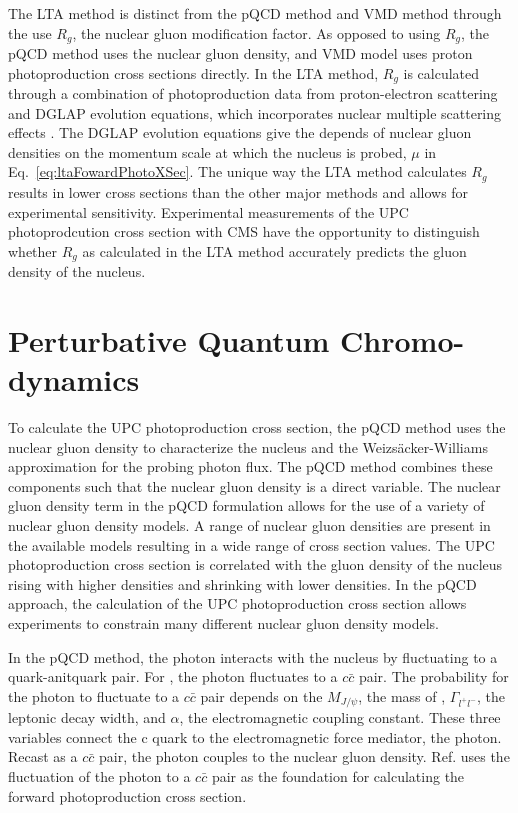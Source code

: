    The LTA method is distinct from the pQCD method and VMD method through the 
     use $R_{g}$, the nuclear gluon modification factor. 
   As opposed to using $R_{g}$, the pQCD method uses the nuclear gluon 
     density, and VMD model uses proton photoproduction cross sections 
     directly. 
   In the LTA method, $R_{g}$ is calculated through a combination of \JPsi{} 
     photoproduction data from proton-electron scattering and DGLAP evolution 
     equations, which incorporates nuclear multiple scattering effects 
     \cite{lta2011.09}. 
   The DGLAP evolution equations give the depends of nuclear gluon densities on
     the momentum scale at which the nucleus is probed, $\mu$ in 
     Eq.~\ref{eq:ltaFowardPhotoXSec}. 
   The unique way the LTA method calculates $R_{g}$ results in lower cross 
     sections than the other major methods and allows for experimental
     sensitivity. 
   Experimental measurements of the UPC \JPsi{} photoprodcution cross section 
     with CMS have the opportunity to distinguish whether $R_{g}$ as calculated 
     in the LTA method accurately predicts the gluon density of the nucleus. 
  
 
  \section{Perturbative Quantum Chromo-dynamics \label{sec:pQCDapp}}
    To calculate the UPC \JPsi{} photoproduction cross section, the pQCD 
      method uses the nuclear gluon density to characterize the nucleus and 
      the Weizs\"{a}cker-Williams approximation for the probing photon flux. 
    The pQCD method combines these components such that the nuclear gluon 
      density is a direct variable.
    The nuclear gluon density term in the pQCD formulation allows for 
      the use of a variety of nuclear gluon density models.
    A range of nuclear gluon densities are present in the available models
      resulting in a wide range of cross section values. 
    The UPC \JPsi{} photoproduction cross section is correlated with the gluon
      density of the nucleus rising with higher densities and shrinking with 
      lower densities. 
    In the pQCD approach, the calculation of the UPC \JPsi{} photoproduction 
      cross section allows experiments to constrain many different nuclear 
      gluon density models. 
    
    In the pQCD method, the photon interacts with the nucleus by fluctuating to 
      a quark-anitquark pair.
    For \JPsi{}, the photon fluctuates to a $c\bar{c}$ pair. 
    The probability for the photon to fluctuate to a $c\bar{c}$ pair
      depends on the $M_{J/\psi}$, the mass of \JPsi{}, $\Gamma_{l^{+}l^{-}}$, 
      the \JPsi{} leptonic decay width, and $\alpha$, the electromagnetic 
      coupling constant.
    These three variables connect the c quark to the electromagnetic force 
      mediator, the photon. 
    Recast as a $c\bar{c}$ pair, the photon couples to the nuclear gluon 
      density.
    Ref. \cite{pQCD2011.08} uses the fluctuation of the photon to a $c\bar{c}$ 
      pair as the foundation for calculating the forward \JPsi{} 
      photoproduction cross section. 

